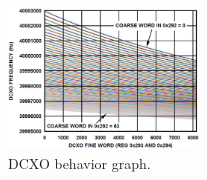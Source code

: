 \begin{figure}[htbp]
    \centering
    \includegraphics[width=0.45\textwidth]{./figures/dcxo_graph}
    \caption{ DCXO behavior graph.
    \label{fig:dcxo}}
\end{figure}

%
%
%
%
%

